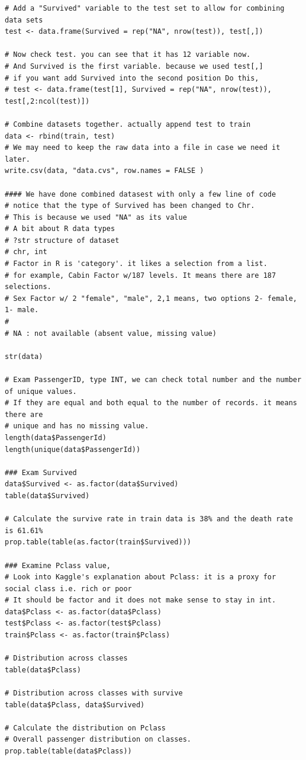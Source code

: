 \documentclass[
]{book}
\begin{document}
\begin{verbatim}
# Add a "Survived" variable to the test set to allow for combining data sets
test <- data.frame(Survived = rep("NA", nrow(test)), test[,])

# Now check test. you can see that it has 12 variable now.
# And Survived is the first variable. because we used test[,]
# if you want add Survived into the second position Do this,
# test <- data.frame(test[1], Survived = rep("NA", nrow(test)), test[,2:ncol(test)])

# Combine datasets together. actually append test to train
data <- rbind(train, test)
# We may need to keep the raw data into a file in case we need it later.
write.csv(data, "data.cvs", row.names = FALSE )

#### We have done combined datasest with only a few line of code
# notice that the type of Survived has been changed to Chr.
# This is because we used "NA" as its value
# A bit about R data types
# ?str structure of dataset
# chr, int
# Factor in R is 'category'. it likes a selection from a list.
# for example, Cabin Factor w/187 levels. It means there are 187 selections.
# Sex Factor w/ 2 "female", "male", 2,1 means, two options 2- female, 1- male.
#
# NA : not available (absent value, missing value)

str(data)

# Exam PassengerID, type INT, we can check total number and the number of unique values.
# If they are equal and both equal to the number of records. it means there are
# unique and has no missing value.
length(data$PassengerId)
length(unique(data$PassengerId))

### Exam Survived
data$Survived <- as.factor(data$Survived)
table(data$Survived)

# Calculate the survive rate in train data is 38% and the death rate is 61.61%
prop.table(table(as.factor(train$Survived)))

### Examine Pclass value,
# Look into Kaggle's explanation about Pclass: it is a proxy for social class i.e. rich or poor
# It should be factor and it does not make sense to stay in int.
data$Pclass <- as.factor(data$Pclass)
test$Pclass <- as.factor(test$Pclass)
train$Pclass <- as.factor(train$Pclass)

# Distribution across classes
table(data$Pclass)

# Distribution across classes with survive
table(data$Pclass, data$Survived)

# Calculate the distribution on Pclass
# Overall passenger distribution on classes.
prop.table(table(data$Pclass))


\end{verbatim}
\end{document}
